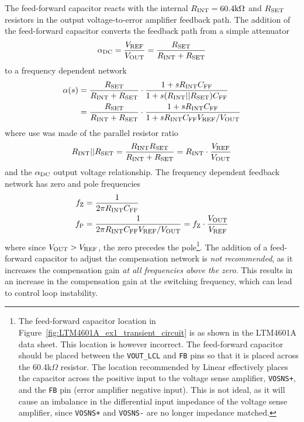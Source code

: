 The feed-forward capacitor reacts with the internal 
$R_{\rm INT} = 60.4\text{k}\Omega$
and $R_{\rm SET}$ resistors in the output voltage-to-error 
amplifier feedback path. The addition of the feed-forward
capacitor converts the feedback path from a simple attenuator
%
\begin{equation}
\alpha_{\rm DC} = \frac{V_{\rm REF}}{V_{\rm OUT}} =
\frac{R_{\rm SET}}{R_{\rm INT} + R_{\rm SET}}
\end{equation}
%
to a frequency dependent network
%
\begin{equation}
\begin{split}
\alpha(s) &= 
\frac{R_{\rm SET}}{R_{\rm INT} + R_{\rm SET}}\cdot
\frac{1+sR_{\rm INT}C_{\rm FF}}
{1+s(R_{\rm INT}||R_{\rm SET})C_{\rm FF}}\\
&=
\frac{R_{\rm SET}}{R_{\rm INT} + R_{\rm SET}}\cdot
\frac{1+sR_{\rm INT}C_{\rm FF}}
{1+sR_{\rm INT}C_{\rm FF}V_{\rm REF}/V_{\rm OUT}}
\end{split}
\end{equation}
%
where use was made of the parallel resistor ratio
%
\begin{equation}
R_{\rm INT}||R_{\rm SET} = \frac{R_{\rm INT}R_{\rm SET}}{R_{\rm INT}+R_{\rm SET}} 
= R_{\rm INT}\cdot\frac{V_{\rm REF}}{V_{\rm OUT}}
\end{equation}
%
and the $\alpha_{\rm DC}$ output voltage relationship.
%
The frequency dependent feedback network has zero and pole frequencies
%
\begin{equation}
\begin{split}
f_{\rm Z} &= \frac{1}{2\pi R_{\rm INT}C_{\rm FF}}\\
f_{\rm P} &= \frac{1}{2\pi R_{\rm INT}C_{\rm FF}V_{\rm REF}/V_{\rm OUT}}
= f_{\rm Z}\cdot\frac{V_{\rm OUT}}{V_{\rm REF}}
\end{split}
\end{equation}
%
where since $V_{\rm OUT} > V_{\rm REF}$, the zero precedes the
pole\footnote{The feed-forward capacitor location in
Figure~\ref{fig:LTM4601A_ex1_transient_circuit} is as shown in 
the LTM4601A data sheet. This location is however incorrect.
The feed-forward capacitor should be placed between the {\tt VOUT\_LCL} and
{\tt FB} pins so that it is placed across the 60.4k$\Omega$
resistor. The location recommended by Linear effectively places the
capacitor across the positive input to the voltage sense amplifier,
{\tt VOSNS+}, and the {\tt FB} pin (error amplifier negative input). 
This is not ideal, as it will cause an imbalance in the differential
input impedance of the voltage sense amplifier, since
{\tt VOSNS+} and {\tt VOSNS-} are no longer impedance matched.}.
%
The addition of a feed-forward capacitor to adjust the compensation network
is {\em not recommended}, as it increases the compensation gain {\em at
all frequencies above the zero}. This results in an increase in the
compensation gain at the switching frequency, which can lead to
control loop instability.

